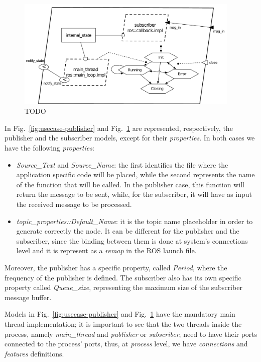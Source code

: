 \begin{figure}[t]
\centering
\includegraphics[width=0.95\textwidth]{gfx/usecase-subscriber}
\caption{TODO}\label{fig:usecase-subscriber}
\end{figure}

In Fig.~\ref{fig:usecase-publisher} and Fig.~\ref{fig:usecase-subscriber} are represented, respectively, the publisher and the subscriber models, except for their \textit{properties}. In both cases we have the following \textit{properties}:
\begin{itemize}
\item \textit{Source\_Text} and \textit{Source\_Name}: the first identifies the file where the application specific code will be placed, while the second represents the name of the function that will be called. In the publisher case, this function will return the message to be sent, while, for the subscriber, it will have as input the received message to be processed.
\item \textit{topic\_properties::Default\_Name}: it is the topic name placeholder in order to generate correctly the node. It can be different for the publisher and the subscriber, since the binding between them is done at system’s connections level and it is represent as a \textit{remap} in the ROS launch file.
\end{itemize}

Moreover, the publisher has a specific property, called \textit{Period}, where the frequency of the publisher is defined. The subscriber also has its own specific property called \textit{Queue\_size}, representing the maximum size of the subscriber message buffer.

Models in Fig.~\ref{fig:usecase-publisher} and Fig.~\ref{fig:usecase-subscriber} have the mandatory main thread implementation; it is important to see that the two threads inside the process, namely \textit{main\_thread} and \textit{publisher} or \textit{subscriber}, need to have their ports connected to the process’ ports, thus, at \textit{process} level, we have \textit{connections} and \textit{features} definitions.

